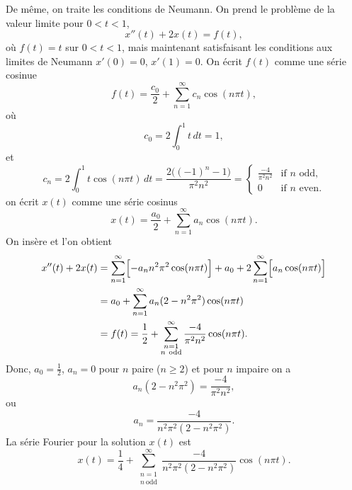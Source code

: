 \begin{example}
De même, on traite les conditions de Neumann.
On prend le problème de la valeur limite pour $0 < t < 1$,
\begin{equation*}
x''(t) + 2 x(t) = f(t) ,
\end{equation*}
où $f(t) = t$ sur $0 < t < 1$, mais maintenant satisfaisant
les conditions aux limites de Neumann
$x'(0) = 0$, $x'(1)=0$.
On écrit $f(t)$ comme une série cosinue
\begin{equation*}
f(t) = \frac{c_0}{2} + \sum_{n=1}^\infty c_n \cos (n \pi t) ,
\end{equation*}
où
\begin{equation*}
c_0 = 2 \int_0^1 t \,dt = 1 ,
\end{equation*}
et
\begin{equation*}
c_n = 2 \int_0^1 t \cos (n \pi t) \,dt =
\frac{2\bigl({(-1)}^n-1\bigr)}{\pi^2 n^2} = 
\begin{cases}
\frac{-4}{\pi^2 n^2} & \text{if } n \text{ odd} , \\
0 & \text{if } n \text{ even}.
\end{cases}
\end{equation*}
on écrit $x(t)$ comme une série cosinus
\begin{equation*}
x(t) = \frac{a_0}{2} + \sum_{n=1}^\infty a_n \cos (n \pi t) .
\end{equation*}
On insère et l'on obtient
\begin{equation*}
\begin{split}
x''(t) + 2 x(t) & =
\sum_{n=1}^\infty \Bigl[ - a_n n^2 \pi^2 \cos (n \pi t) \Bigr]
+
a_0 +
2
\sum_{n=1}^\infty \Bigl[ a_n \cos (n \pi t) \Bigr]
\\
& =
a_0 +
\sum_{n=1}^\infty a_n (2 - n^2 \pi^2 ) \cos (n \pi t)
\\
& = f(t)
=
\frac{1}{2} +
\sum_{\substack{n=1\\n~\text{odd}}}^\infty
\frac{-4}{\pi^2 n^2} \cos (n \pi t) .
\end{split}
\end{equation*}
Donc, $a_0 = \frac{1}{2}$, $a_n = 0$ pour $n$ paire ($n \geq 2$) et pour
$n$ impaire on a
\begin{equation*}
a_n (2 - n^2 \pi^2)
=
\frac{-4}{\pi^2 n^2} ,
\end{equation*}
ou
\begin{equation*}
a_n
=
\frac{-4}{n^2 \pi^2 (2 - n^2 \pi^2)} .
\end{equation*}
La série Fourier pour la solution $x(t)$ est
\begin{equation*}
x(t) = 
\frac{1}{4} +
\sum_{\substack{n=1\\n~\text{odd}}}^\infty
\frac{-4}{n^2 \pi^2 (2 - n^2 \pi^2)} 
\cos (n \pi t) .
\end{equation*}
\end{example}

